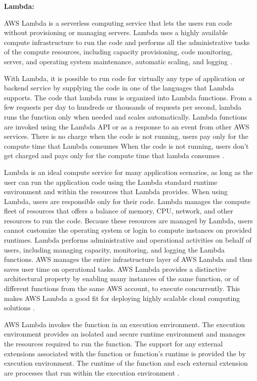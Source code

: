\clearpage
\textbf{Lambda:}
\par AWS Lambda is a serverless computing service that lets the users run code without provisioning or managing servers.
Lambda uses a highly available compute infrastructure to run the code and performs all the administrative tasks of the compute resources, including capacity provisioning, code monitoring, server, and operating system maintenance, automatic scaling, and logging \cite{45}.

\par With Lambda, it is possible to run code for virtually any type of application or backend service by supplying the code in one of the languages that Lambda supports.
The code that lambda runs is organized into Lambda functions.
From a few requests per day to hundreds or thousands of
requests per second, lambda runs the function only when
needed and scales automatically.
Lambda functions are invoked using the Lambda API or as a response to an event from other AWS services.
There is no charge when the code is not running, users pay only for the compute time that Lambda consumes
When the code is not running, users don't get charged
and pays only for the compute time
that lambda consumes \cite{46}.

\par Lambda is an ideal compute service for many application scenarios, as long as the user can run the application code using the Lambda standard runtime environment and within the resources that Lambda provides.
When using Lambda, users are responsible only for their code.
Lambda manages the compute fleet of resources that offers a balance of memory, CPU, network, and other resources to run the code.
Because these resources are managed by Lambda, users cannot customize the operating system or login to compute instances on provided runtimes.
Lambda performs administrative and operational activities on behalf of users, including managing capacity, monitoring, and logging the Lambda functions.
AWS manages the entire infrastructure layer of AWS Lambda
and thus saves user time on operational tasks. AWS Lambda
provides a distinctive architectural property by enabling many instances of the same function, or of different functions from the same AWS account, to execute concurrently. This makes AWS Lambda a good fit for deploying highly scalable cloud computing solutions \cite{46}.

\par AWS Lambda invokes the function in an execution environment.
The execution environment provides an isolated and secure runtime environment and manages the resources required to run the function.
The support for any external extensions associated with
the function or function's runtime is provided the by
execution environment.
The runtime of the function and each external extension are
processes that run within the execution environment
\cite{46}.


